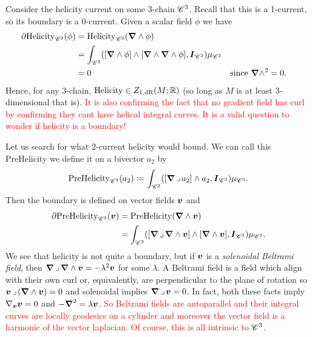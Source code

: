 \documentclass{article}
\begin{document}
\begin{example}
\label{ex:helicity_and_beltrami}
Consider the helicity current on some 3-chain $\mathscr{C}^3$. Recall that this is a 1-current, so its boundary is a 0-current. Given a scalar field $\phi$ we have
\begin{align}
    \partial \mathrm{Helicity}_{\mathscr{C}^3}(\phi) &= \mathrm{Helicity}_{\mathscr{C}^3}(\boldsymbol{\nabla} \wedge \phi)\\
    &= \int_{\mathscr{C}^3}([\boldsymbol{\nabla} \wedge \phi] \wedge [\boldsymbol{\nabla} \wedge \boldsymbol{\nabla} \wedge \phi], \boldsymbol{I}_{\mathscr{C}^3})\mu_{\mathscr{C}^3}\\
    &=0 &&\textrm{since $\boldsymbol{\nabla} \wedge^2=0$}.
\end{align}
Hence, for any 3-chain, $\mathrm{Helicity}\in Z_{1,\mathrm{dR}}(M;\mathbb{R})$ (so long as $M$ is at least 3-dimensional that is). \textcolor{red}{It is also confirming the fact that no gradient field has curl by confirming they cant have helical integral curves. It is a valid question to wonder if helicity is a boundary!}

Let us search for what $2$-current helicity would bound. We can call this PreHelicity we define it on a bivector $a_2$ by
\begin{equation}
    \mathrm{PreHelicity}_{\mathscr{C}^3}(a_2) \coloneqq \int_{\mathscr{C}^3} ([\boldsymbol{\nabla} \hspace*{.5mm}\lrcorner \hspace*{.5mm} a_2]\wedge a_2, \boldsymbol{I}_{\mathscr{C}^3})\mu_{\mathscr{C}^3}.
\end{equation}
Then the boundary is defined on vector fields $\boldsymbol{v}$ and
\begin{align}
    \partial \mathrm{PreHelicity}_{\mathscr{C}^3}(\boldsymbol{v}) &= \mathrm{PreHelicity}(\boldsymbol{\nabla} \wedge \boldsymbol{v})\\
        &= \int_{\mathscr{C}^3} ([\boldsymbol{\nabla} \hspace*{.5mm}\lrcorner \hspace*{.5mm} \boldsymbol{\nabla} \wedge \boldsymbol{v}]\wedge [\boldsymbol{\nabla} \wedge \boldsymbol{v}],\boldsymbol{I}_{\mathscr{C}^3})\mu_{\mathscr{C}^3}.
\end{align}
We see that helicity is not quite a boundary, but if $\boldsymbol{v}$ is a \emph{solenoidal Beltrami field}, then $\boldsymbol{\nabla} \hspace*{.5mm}\lrcorner \hspace*{.5mm} \boldsymbol{\nabla} \wedge \boldsymbol{v} = -\lambda^2 \boldsymbol{v}$ for some $\lambda$. A Beltrami field is a field which align with their own curl or, equivalently, are perpendicular to the plane of rotation so $\boldsymbol{v} \hspace*{.5mm}\lrcorner \hspace*{.5mm} (\boldsymbol{\nabla} \wedge \boldsymbol{v})=0$ and solenoidal implies $\boldsymbol{\nabla} \hspace*{.5mm}\lrcorner \hspace*{.5mm} \boldsymbol{v}=0$. In fact, both these facts imply $\nabla_{\boldsymbol{v}}\boldsymbol{v}=0$ and $-\boldsymbol{\nabla}^2 = \lambda \boldsymbol{v}$. \textcolor{red}{So Beltrami fields are autoparallel and their integral curves are locally geodesics on a cylinder and moreover the vector field is a harmonic of the vector laplacian. Of course, this is all intrinsic to $\mathscr{C}^3$.}
\end{example}
\end{document}
